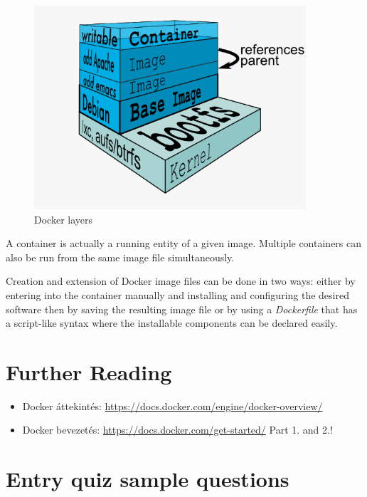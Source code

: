\documentclass[a4paper]{article}
\begin{document}
\begin{figure}[H]
    \centering
    \includegraphics[width=0.9\textwidth]{figures/docker_layers.png}
    \caption{Docker layers}
    \label{fig:layers}
\end{figure}

A container is actually a running entity of a given image. Multiple containers can also be run from the same image file simultaneously.

Creation and extension of Docker image files can be done in two ways: either by entering into the container manually and installing and configuring the desired software then by saving the resulting image file or by using a \emph{Dockerfile} that has a script-like syntax where the
installable components can be declared easily.

\section{Further Reading}

\begin{itemize}
    \item Docker áttekintés: \url{https://docs.docker.com/engine/docker-overview/}
    \item Docker bevezetés: \url{https://docs.docker.com/get-started/} Part 1. and 2.!
\end{itemize}

\appendix

\section{Entry quiz sample questions}
\end{document}
